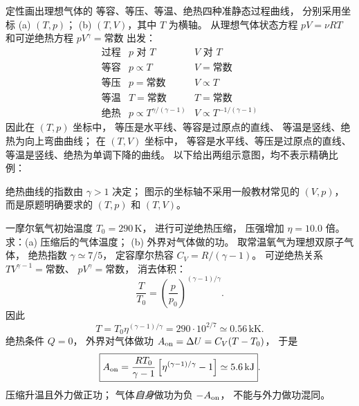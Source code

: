 定性画出理想气体的
等容、等压、等温、绝热四种准静态过程曲线，
分别采用坐标
(a) $(T,p)$；
(b) $(T,V)$，其中 $T$ 为横轴。
\exsolution
从理想气体状态方程
$pV=\nu RT$ 和可逆绝热方程
$pV^\gamma=\text{常数}$ 出发：
\[
\begin{array}{c|c|c}
\text{过程}&p\text{ 对 }T&V\text{ 对 }T\\ \hline
\text{等容}&p\propto T&V=\text{常数}\\
\text{等压}&p=\text{常数}&V\propto T\\
\text{等温}&T=\text{常数}&T=\text{常数}\\
\text{绝热}&p\propto T^{\gamma/(\gamma-1)}
&V\propto T^{-1/(\gamma-1)}
\end{array}
\]
因此在 $(T,p)$ 坐标中，
等压是水平线、等容是过原点的直线、
等温是竖线、绝热为向上弯曲曲线；
在 $(T,V)$ 坐标中，
等容是水平线、等压是过原点的直线、
等温是竖线、绝热为单调下降的曲线。
以下给出两组示意图，均不表示精确比例：
\begin{center}
\end{center}
\excheck 绝热曲线的指数由 $\gamma>1$ 决定；
图示的坐标轴不采用一般教材常见的 $(V,p)$，
而是原题明确要求的 $(T,p)$ 和 $(T,V)$。

一摩尔氧气初始温度
$T_0=290\,\mathrm K$，
进行可逆绝热压缩，
压强增加 $\eta=10.0$ 倍。
求：(a) 压缩后的气体温度；
(b) 外界对气体做的功。
\exsolution
取常温氧气为理想双原子气体，
绝热指数 $\gamma\simeq7/5$，
定容摩尔热容
$C_V=R/(\gamma-1)$。
可逆绝热关系
$TV^{\gamma-1}=\text{常数}$、
$pV^\gamma=\text{常数}$，
消去体积：
\[
\frac T{T_0}=
\left(\frac p{p_0}\right)^{(\gamma-1)/\gamma}.
\]
因此
\[
\boxed{T=T_0\eta^{(\gamma-1)/\gamma}
=290\cdot10^{2/7}
\simeq0.56\,\mathrm{kK}}.
\]
绝热条件 $Q=0$，
外界对气体做功
$A_{\rm on}=\Delta U=C_V(T-T_0)$，
于是
\[
\boxed{A_{\rm on}
=\frac{RT_0}{\gamma-1}
\left[\eta^{(\gamma-1)/\gamma}-1\right]
\simeq5.6\,\mathrm{kJ}}.
\]
\excheck 压缩升温且外力做正功；
气体\emph{自身}做功为负 $-A_{\rm on}$，
不能与外力做功混同。

